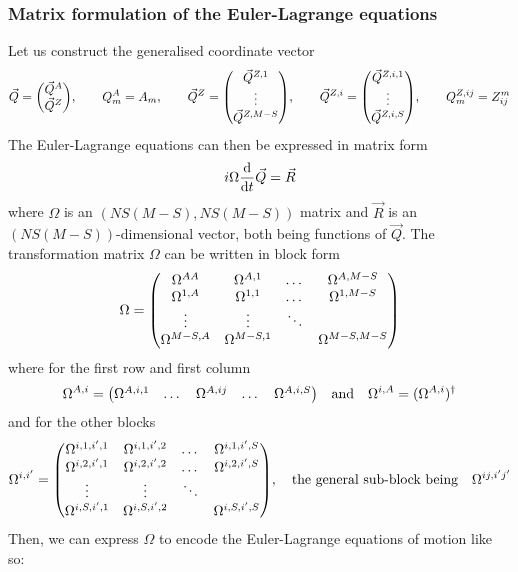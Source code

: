 \documentclass[12pt]{article}
\newcommand{\hc}{^\dagger}
\begin{document}
	\subsubsection{Matrix formulation of the Euler-Lagrange equations}
	Let us construct the generalised coordinate vector
	\begin{equation}
	\vec{Q} = \mqty(\vec{Q}^A \\ \vec{Q}^Z),\qquad Q^A_m = A_m, \qquad \vec{Q}^Z=\mqty(\vec{Q}^{Z,1} \\ \vdots \\ \vec{Q}^{Z,M-S}), \qquad \vec{Q}^{Z,i} = \mqty(\vec{Q}^{Z,i,1} \\ \vdots \\ \vec{Q}^{Z,i,S}), \qquad Q^{Z,ij}_m = Z^m_{ij}
	\end{equation}
	The Euler-Lagrange equations can then be expressed in matrix form
	\begin{equation}
	i\Omega\dv{t}\vec{Q}=\vec{R}
	\end{equation}
	where $\Omega$ is an $(NS(M-S),NS(M-S))$ matrix and $\vec{R}$ is an $(NS(M-S))$-dimensional vector, both being functions of $\vec{Q}$. The transformation matrix $\Omega$ can be written in block form
	\begin{equation}
	\Omega = \mqty(
		\Omega^{AA} & \Omega^{A,1} & \dots & \Omega^{A,M-S}\\
		\Omega^{1,A} & \Omega^{1,1} & \dots & \Omega^{1,M-S}\\
		\vdots & \vdots & \ddots & \\
		\Omega^{M-S,A} & \Omega^{M-S,1} & & \Omega^{M-S,M-S}
	)
	\end{equation}
	where for the first row and first column
	\begin{equation}
	\Omega^{A,i}=\mqty(\Omega^{A,i,1} & \dots & \Omega^{A,ij} & \dots & \Omega^{A,i,S})\qq{and}\Omega^{i,A}=(\Omega^{A,i})\hc
	\end{equation}
	and for the other blocks
	\begin{equation}
	\Omega^{i,i'}=\mqty(
		\Omega^{i,1,i',1} & \Omega^{i,1,i',2} & \dots & \Omega^{i,1,i',S} \\
		\Omega^{i,2,i',1} & \Omega^{i,2,i',2} & \dots & \Omega^{i,2,i',S} \\
		\vdots & \vdots & \ddots & \\
		\Omega^{i,S,i',1} & \Omega^{i,S,i',2} & & \Omega^{i,S,i',S}
	),\qq{the general sub-block being}\Omega^{ij,i'j'}
	\end{equation}
	Then, we can express $\Omega$ to encode the Euler-Lagrange equations of motion like so:
\end{document}
